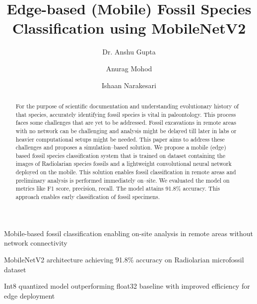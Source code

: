 \documentclass[a4paper,fleqn]{cas-sc}
\begin{document}
\let\WriteBookmarks\relax
\def\floatpagepagefraction{1}
\def\textpagefraction{.001}

\title [mode = title]{Edge-based (Mobile) Fossil Species Classification using MobileNetV2}                      

\author[1]{Dr. Anshu Gupta}
\cormark[1]



\author[1]{Anurag Mohod}


\author[1]{Ishaan Narakesari}



\begin{abstract}
For the purpose of scientific documentation and understanding evolutionary history of that species, accurately identifying fossil species is vital in paleontology. This process faces some challenges that are yet to be addressed. Fossil excavations in remote areas with no network can be challenging and analysis might be delayed till later in labs or heavier computational setups might be needed. This paper aims to address these challenges and proposes a simulation--based solution. We propose a mobile (edge) based fossil species classification system that is trained on dataset containing the images of Radiolarian species fossils and a lightweight convolutional neural network deployed on the mobile. This solution enables fossil classification in remote areas and preliminary analysis is performed immediately on--site. We evaluated the model on metrics like F1 score, precision, recall. The model attains 91.8\% accuracy. This approach enables early classification of fossil specimens.
\end{abstract}

\begin{highlights}
\item Mobile-based fossil classification enabling on-site analysis in remote areas without network connectivity
\item MobileNetV2 architecture achieving 91.8\% accuracy on Radiolarian microfossil dataset
\item Int8 quantized model outperforming float32 baseline with improved efficiency for edge deployment
\end{highlights}
\end{document}
